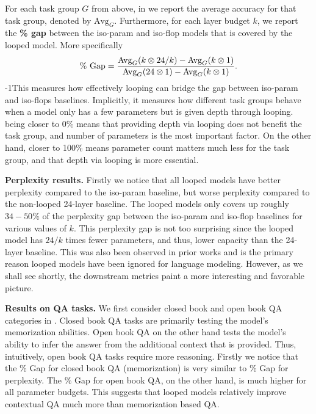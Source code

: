 For each task group $G$ from above, in  we report the average accuracy for that task group, denoted by $\text{Avg}_{G}$. Furthermore, for each layer budget $k$, we report the {\bf \% gap} between the iso-param and iso-flop models that is covered by the looped model. More specifically
\begin{align}
    \text{\% Gap} = \frac{\text{Avg}_{G}\text{$(k\otimes 24/k)$} - \text{Avg}_{G}\text{$(k\otimes 1)$}}{\text{Avg}_{G}\text{$(24\otimes 1)$} - \text{Avg}_{G}\text{$(k\otimes 1)$}}\label{eq:gap_pct}.
\end{align}
\looseness-1This measures how effectively looping can bridge the gap between iso-param and iso-flops baselines. Implicitly, it measures how different task groups behave when a model only has a few parameters but is given depth through looping.
 being closer to 0\% means that providing depth via looping does not benefit the task group, and number of parameters is the most important factor. On the other hand,  closer to 100\% means parameter count matters much less for the task group, and that depth via looping is more essential.


\textbf{Perplexity results.} Firstly we notice that all  looped models have better perplexity compared to the iso-param  baseline, but worse perplexity compared to the non-looped 24-layer baseline.
The looped models only covers up roughly $34-50\%$ of the perplexity gap between the iso-param and iso-flop baselines for various values of $k$.
This perplexity gap is not too surprising since the looped model has $24/k$ times fewer parameters, and thus, lower capacity than the 24-layer baseline.
This was also been observed in prior works \citep{lan2019albert,mohtashami2023cotformer} and is the primary reason looped models have been ignored for language modeling.
However, as we shall see shortly, the downstream metrics paint a more interesting and favorable picture.


\vspace{-0.1in}


\textbf{Results on QA tasks.} We first consider closed book and open book QA categories in . Closed book QA tasks are primarily testing the model's memorization abilities. Open book QA on the other hand tests the model's ability to infer the answer from the additional context that is provided. Thus, intuitively, open book QA tasks require more reasoning. Firstly we notice that the \% Gap for closed book QA (memorization) is very similar to \% Gap for perplexity. The \% Gap for open book QA, on the other hand, is much higher for all parameter budgets. This suggests that looped models relatively improve contextual QA much more than memorization based QA.


